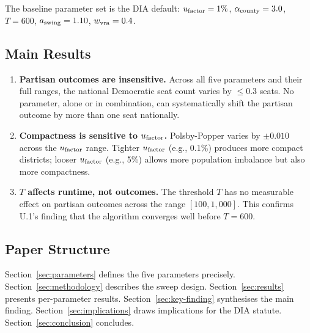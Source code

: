 The baseline parameter set is the DIA default: $u_{\mathrm{factor}} = 1\%$,
$\alpha_{\mathrm{county}} = 3.0$, $T = 600$, $a_{\mathrm{swing}} = 1.10$, $w_{\mathrm{vra}} = 0.4$.

\subsection{Main Results}

\begin{enumerate}
\item \textbf{Partisan outcomes are insensitive.}
      Across all five parameters and their full ranges, the national
      Democratic seat count varies by $\leq 0.3$ seats.
      No parameter, alone or in combination, can systematically shift the
      partisan outcome by more than one seat nationally.
\item \textbf{Compactness is sensitive to $u_{\mathrm{factor}}$.}
      Polsby-Popper varies by $\pm 0.010$ across the $u_{\mathrm{factor}}$ range.
      Tighter $u_{\mathrm{factor}}$ (e.g., 0.1\%) produces more compact districts;
      looser $u_{\mathrm{factor}}$ (e.g., 5\%) allows more population imbalance
      but also more compactness.
\item \textbf{$T$ affects runtime, not outcomes.}
      The \cs{} threshold $T$ has no measurable effect on partisan
      outcomes across the range $[100, 1{,}000]$.
      This confirms U.1's finding that the algorithm converges well
      before $T = 600$.
\end{enumerate}

\subsection{Paper Structure}

Section~\ref{sec:parameters} defines the five parameters precisely.
Section~\ref{sec:methodology} describes the sweep design.
Section~\ref{sec:results} presents per-parameter results.
Section~\ref{sec:key-finding} synthesises the main finding.
Section~\ref{sec:implications} draws implications for the DIA statute.
Section~\ref{sec:conclusion} concludes.
